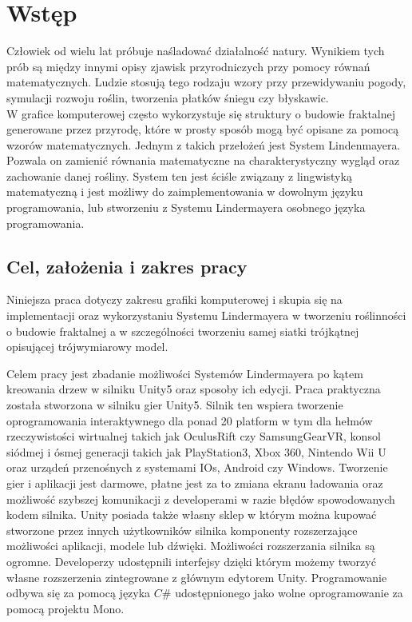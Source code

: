 \documentclass[12pt]{report}
\begin{document}
\tableofcontents	%
\begin{sloppypar}
\chapter{Wstęp} \label{rozdz.wstep} 
Człowiek od wielu lat próbuje naśladować działalność natury. Wynikiem tych prób są między innymi opisy zjawisk przyrodniczych przy pomocy równań matematycznych. Ludzie stosują tego rodzaju wzory przy  przewidywaniu pogody, symulacji rozwoju roślin, tworzenia płatków śniegu czy błyskawic.\\W grafice komputerowej często wykorzystuje się struktury o budowie fraktalnej generowane przez przyrodę, które w prosty sposób mogą być opisane za pomocą wzorów matematycznych.
\newline\newline
Jednym z takich przełożeń jest System Lindenmayera. Pozwala on zamienić równania matematyczne na charakterystyczny wygląd oraz zachowanie danej rośliny. System ten jest ściśle związany z lingwistyką matematyczną i jest możliwy do zaimplementowania w dowolnym języku programowania, lub stworzeniu z Systemu Lindermayera osobnego języka programowania. 


\section{Cel, założenia i zakres pracy}
Niniejsza praca dotyczy zakresu grafiki komputerowej i skupia się na implementacji oraz wykorzystaniu Systemu Lindermayera w tworzeniu roślinności \\o budowie fraktalnej a w szczególności tworzeniu samej siatki trójkątnej opisującej trójwymiarowy model. 

Celem pracy jest zbadanie możliwości Systemów Lindermayera po kątem kreowania drzew w silniku Unity5 oraz sposoby ich edycji.
Praca praktyczna została stworzona w silniku gier Unity5\cite{unity}. Silnik ten wspiera tworzenie oprogramowania interaktywnego dla ponad 20 platform w tym dla hełmów rzeczywistości wirtualnej takich jak OculusRift czy SamsungGearVR, konsol siódmej i ósmej generacji takich jak PlayStation3, Xbox 360, Nintendo Wii U oraz urządeń przenośnych z systemami IOs, Android czy Windows. Tworzenie gier i aplikacji jest darmowe, płatne jest za to zmiana ekranu ładowania oraz możliwość szybszej komunikacji z developerami w razie błędów spowodowanych kodem silnika. Unity posiada także własny sklep w którym można kupować stworzone przez innych użytkowników silnika komponenty rozszerzające możliwości aplikacji, modele lub dźwięki. Możliwości rozszerzania silnika są ogromne. Developerzy udostępnili interfejsy dzięki którym możemy tworzyć własne rozszerzenia zintegrowane z głównym edytorem Unity. Programowanie odbywa się za pomocą języka $C\#$ udostępnionego jako wolne oprogramowanie za pomocą projektu Mono\cite{mono}.


\end{sloppypar}
\end{document}
